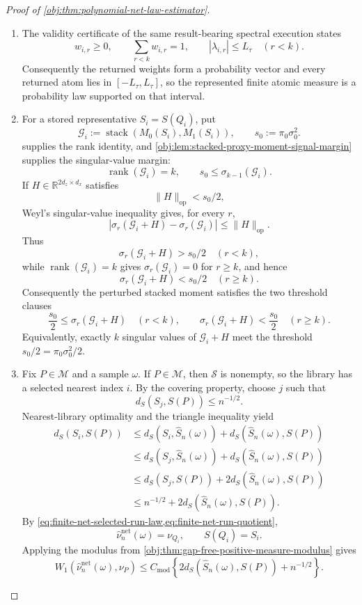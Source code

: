 \begin{proof}[Proof of \cref{obj:thm:polynomial-net-law-estimator}]
\begin{enumerate}
\item The validity certificate of the same result-bearing spectral execution
states
\[
w_{i,r}\ge0,\qquad
\sum_{r<k}w_{i,r}=1,\qquad
|\lambda_{i,r}|\le L_\tau
\quad(r<k).
\]
Consequently the returned weights form a probability vector and every returned atom lies in \([-L_\tau,L_\tau]\), so the represented finite atomic measure is a probability law supported on that interval. %

\item For a stored representative \(S_i=S(Q_i)\), put
\[
\mathcal G_i:=\operatorname{stack}(M_0(S_i),M_1(S_i)),
\qquad
s_0:=\pi_0\sigma_0^2 .
\]
 supplies the rank identity,
and \cref{obj:lem:stacked-proxy-moment-signal-margin} supplies the
singular-value margin:
\[
\operatorname{rank}(\mathcal G_i)=k,
\qquad
s_0\le \sigma_{k-1}(\mathcal G_i).
\]
If \(H\in\mathbb R^{2d_z\times d_x}\) satisfies
\[
\|H\|_{\mathrm{op}}<s_0/2,
\]
Weyl's singular-value inequality gives, for every \(r\),
\[
|\sigma_r(\mathcal G_i+H)-\sigma_r(\mathcal G_i)|
\le \|H\|_{\mathrm{op}}.
\]
Thus
\[
\sigma_r(\mathcal G_i+H)>s_0/2\quad(r<k),
\]
while \(\operatorname{rank}(\mathcal G_i)=k\) gives
\(\sigma_r(\mathcal G_i)=0\) for \(r\ge k\), and hence
\[
\sigma_r(\mathcal G_i+H)<s_0/2\quad(r\ge k).
\]
Consequently the perturbed stacked moment satisfies the two threshold clauses
\[
\frac{s_0}{2}\le \sigma_r(\mathcal G_i+H)\quad(r<k),
\qquad
\sigma_r(\mathcal G_i+H)<\frac{s_0}{2}\quad(r\ge k).
\]
Equivalently, exactly \(k\) singular values of \(\mathcal G_i+H\) meet the
threshold \(s_0/2=\pi_0\sigma_0^2/2\). %

\item Fix \(P\in\mathcal M\) and a sample \(\omega\).  If \(P\in\mathcal M\),
then \(\mathscr S\) is nonempty, so the library has a selected nearest index
\(i\).  By the covering property, choose \(j\) such that
\[
d_S(S_j,S(P))\le n^{-1/2}.
\]
Nearest-library optimality and the triangle inequality yield
\[
\begin{aligned}
d_S(S_i,S(P))
&\le d_S(S_i,\widehat S_n(\omega))
   +d_S(\widehat S_n(\omega),S(P))\\
&\le d_S(S_j,\widehat S_n(\omega))
   +d_S(\widehat S_n(\omega),S(P))\\
&\le d_S(S_j,S(P))
   +2d_S(\widehat S_n(\omega),S(P))\\
&\le n^{-1/2}+2d_S(\widehat S_n(\omega),S(P)).
\end{aligned}
\]
By \cref{eq:finite-net-selected-run-law,eq:finite-net-run-quotient},
\[
\widehat\nu_n^{\mathrm{net}}(\omega)=\nu_{Q_i},
\qquad
S(Q_i)=S_i.
\]
Applying the modulus from \cref{obj:thm:gap-free-positive-measure-modulus}
gives
\[
W_1\!\left(\widehat\nu_n^{\mathrm{net}}(\omega),\nu_P\right)
\le
C_{\mathrm{mod}}
\left\{
2d_S(\widehat S_n(\omega),S(P))+n^{-1/2}
\right\}.
\] %


\end{enumerate}
\end{proof}
